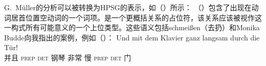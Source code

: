 \begin{exe}
\begin{xlist}[iv.]
\begin{exe}
\begin{xlist}[iv.]
G.\ Müller的分析可以被转换为HPSG的表示，如（）所示：
\ea
{}
\z
（）包含了出现在动词居首位置空动词的一个词项。是一个更概括关系的占位符，该关系应该被视作这一构式所有可能意义的一个上位类型。这些语义包括schmeißen（去扔）和Monika Budde向我指出的案例，例如（）：
\ea
\label{Klavier-durch-die-Tuer}
\gll Und mit dem Klavier ganz langsam durch die Tür!\\
	 并且 \textsc{prep} \textsc{det} 钢琴 非常 慢 \textsc{prep} \textsc{det} 门\\

\end{xlist}
\end{exe}
\end{xlist}
\end{exe}
